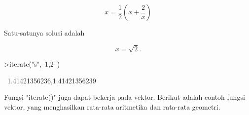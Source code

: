 \documentclass[a4paper,10pt]{article}
\begin{document}
\begin{eulernotebook}
\begin{eulercomment}
\begin{eulercomment}
\begin{eulercomment}
\begin{eulercomment}
\begin{eulercomment}
\begin{eulercomment}
\begin{eulercomment}
\begin{eulercomment}
\begin{eulercomment}
\begin{eulercomment}
\begin{eulercomment}
\begin{eulercomment}
\begin{eulercomment}
\begin{eulercomment}
\begin{eulercomment}
\begin{eulercomment}
\begin{eulercomment}
\begin{eulercomment}
\begin{eulercomment}
\begin{eulercomment}
\begin{eulercomment}
\begin{eulercomment}
\begin{eulercomment}
\begin{eulercomment}
\begin{eulercomment}
\begin{eulercomment}
\begin{eulercomment}
\begin{eulercomment}
\begin{eulercomment}
\begin{eulercomment}
\begin{eulercomment}
\begin{eulercomment}
\begin{eulercomment}
\end{eulercomment}
\begin{eulerformula}
\[
x = \frac{1}{2} \left( x + \frac{2}{x} \right)
\]
\end{eulerformula}
\begin{eulercomment}
Satu-satunya solusi adalah

\end{eulercomment}
\begin{eulerformula}
\[
x = \sqrt2.
\]
\end{eulerformula}
\begin{eulerprompt}
>iterate("s",~1,2~)
\end{eulerprompt}
\begin{euleroutput}
  ~1.41421356236,1.41421356239~
\end{euleroutput}
\begin{eulercomment}
Fungsi "iterate()" juga dapat bekerja pada vektor. Berikut adalah
contoh fungsi vektor, yang menghasilkan rata-rata aritmetika dan
rata-rata geometri.


\end{eulercomment}
\end{eulercomment}
\end{eulercomment}
\end{eulercomment}
\end{eulercomment}
\end{eulercomment}
\end{eulercomment}
\end{eulercomment}
\end{eulercomment}
\end{eulercomment}
\end{eulercomment}
\end{eulercomment}
\end{eulercomment}
\end{eulercomment}
\end{eulercomment}
\end{eulercomment}
\end{eulercomment}
\end{eulercomment}
\end{eulercomment}
\end{eulercomment}
\end{eulercomment}
\end{eulercomment}
\end{eulercomment}
\end{eulercomment}
\end{eulercomment}
\end{eulercomment}
\end{eulercomment}
\end{eulercomment}
\end{eulercomment}
\end{eulercomment}
\end{eulercomment}
\end{eulercomment}
\end{eulercomment}
\end{eulernotebook}
\end{document}
